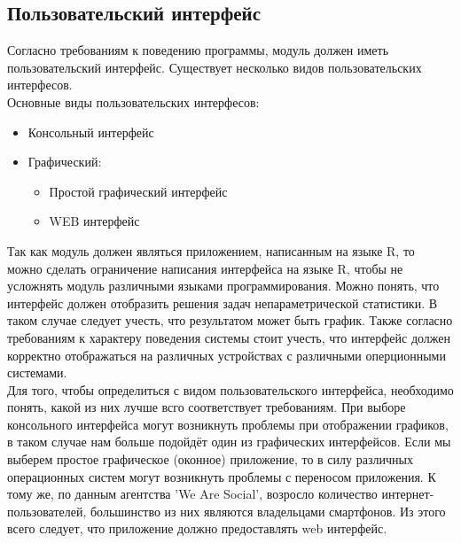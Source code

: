 \documentclass[14pt,a4paper]{scrartcl}
\begin{document}
    \subsection{Пользовательский интерфейс}
    Согласно требованиям к поведению программы, модуль должен иметь пользовательский интерфейс.
    Существует несколько видов пользовательских интерфесов.\\
    Основные виды пользовательских интерфесов:
    \begin{itemize}
        \item Консольный интерфейс
        \item Графический:
        \begin{itemize}
            \item Простой графический интерфейс
            \item WEB интерфейс
        \end{itemize}
    \end{itemize}
    Так как модуль должен являться приложением, написанным на языке R, то можно сделать ограничение написания интерфейса
    на языке R, чтобы не усложнять модуль различными языками программирования.
    Можно понять, что интерфейс должен отобразить решения задач непараметрической статистики.
    В таком случае следует учесть, что результатом может быть график.
    Также согласно требованиям к характеру поведения системы стоит учесть, что интерфейс должен корректно
    отображаться на различных устройствах с различными оперционными системами.\\
    Для того, чтобы определиться с видом пользовательского интерфейса, необходимо понять, какой из них лучше всго соответствует требованиям.
    При выборе консольного интерфейса могут возникнуть проблемы при отображении графиков, в таком случае нам больше подойдёт один из графических интерфейсов.
    Если мы выберем простое графическое (оконное) приложение, то в силу различных операционных систем могут возникнуть проблемы с переносом приложения.
    К тому же, по данным агентства 'We Are Social', возросло количество интернет-пользователей, большинство из них являются владельцами смартфонов\cite{Internet-statistic-2018}.
    Из этого всего следует, что приложение должно предоставлять web интерфейс.
\end{document}
